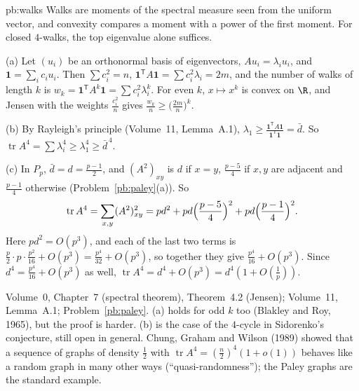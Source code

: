 \begin{solution}{pb:walks}
\idea Walks are moments of the spectral measure seen from the uniform vector, and convexity compares a moment with a power of the
first moment. For closed $4$-walks, the top eigenvalue alone suffices.

\writeup (a) Let $(u_i)$ be an orthonormal basis of eigenvectors, $A u_i=\lambda_iu_i$, and $\mathbf1=\sum_ic_iu_i$. Then $\sum c_i^2=n$,
$\mathbf1^{\mathsf T}A\mathbf1=\sum c_i^2\lambda_i=2m$, and the number of walks of length $k$ is $w_k=\mathbf1^{\mathsf T}A^k\mathbf1=\sum c_i^2\lambda_i^k$. For even
$k$, $x\mapsto x^k$ is convex on $\R$, and Jensen with the weights $\frac{c_i^2}n$ gives $\frac{w_k}n\ge\bigl(\frac{2m}n\bigr)^k$.

(b) By Rayleigh's principle (Volume~11, Lemma~A.1), $\lambda_1\ge\frac{\mathbf1^{\mathsf T}A\mathbf1}{\mathbf1^{\mathsf T}\mathbf1}=\bar d$. So
$\operatorname{tr}A^4=\sum\lambda_i^4\ge\lambda_1^4\ge\bar d^{\,4}$.

(c) In $P_p$, $\bar d=d=\frac{p-1}2$, and $(A^2)_{xy}$ is $d$ if $x=y$, $\frac{p-5}4$ if $x,y$ are adjacent and $\frac{p-1}4$ otherwise
(Problem~\ref{pb:paley}(a)). So
\[
\operatorname{tr}A^4=\sum_{x,y}(A^2)_{xy}^2=pd^2+pd\Bigl(\frac{p-5}4\Bigr)^2+pd\Bigl(\frac{p-1}4\Bigr)^2.
\]
Here $pd^2=O(p^3)$, and each of the last two terms is $\frac p2\cdot p\cdot\frac{p^2}{16}+O(p^3)=\frac{p^4}{32}+O(p^3)$, so together they
give $\frac{p^4}{16}+O(p^3)$. Since $d^4=\frac{p^4}{16}+O(p^3)$ as well, $\operatorname{tr}A^4=d^4+O(p^3)=d^4(1+O(\frac1p))$.

\tools Volume~0, Chapter~7 (spectral theorem), Theorem~4.2 (Jensen); Volume~11, Lemma~A.1; Problem~\ref{pb:paley}.
\leads (a) holds for odd $k$ too (Blakley and Roy, 1965), but the proof is harder. (b) is the case of the $4$-cycle in Sidorenko's
conjecture, still open in general. Chung, Graham and Wilson (1989) showed that a sequence of graphs of density $\frac12$ with
$\operatorname{tr}A^4=(\frac n2)^4(1+o(1))$ behaves like a random graph in many other ways (``quasi-randomness''); the Paley graphs are the
standard example.
\end{solution}

